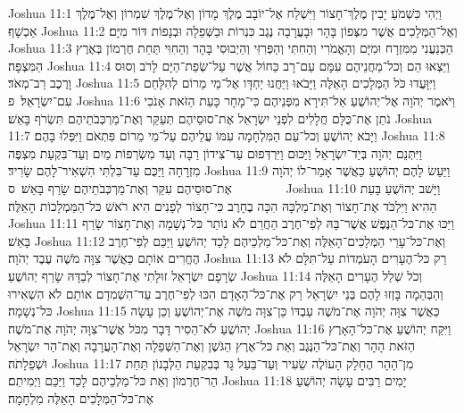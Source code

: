 Joshua 11:1	וַיְהִי כִּשְׁמֹעַ יָבִין מֶלֶךְ־חָצוֹר וַיִּשְׁלַח אֶל־יוֹבָב מֶלֶךְ מָדוֹן וְאֶל־מֶלֶךְ שִׁמְרוֹן וְאֶל־מֶלֶךְ אַכְשָׁף׃
Joshua 11:2	וְאֶל־הַמְּלָכִים אֲשֶׁר מִצְּפוֹן בָּהָר וּבָעֲרָבָה נֶגֶב כִּנְרוֹת וּבַשְּׁפֵלָה וּבְנָפוֹת דּוֹר מִיָּם׃
Joshua 11:3	הַכְּנַעֲנִי מִמִּזְרָח וּמִיָּם וְהָאֱמֹרִי וְהַחִתִּי וְהַפְּרִזִּי וְהַיְבוּסִי בָּהָר וְהַחִוִּי תַּחַת חֶרְמוֹן בְּאֶרֶץ הַמִּצְפָּה׃
Joshua 11:4	וַיֵּצְאוּ הֵם וְכל־מַחֲנֵיהֶם עִמָּם עַם־רָב כַּחוֹל אֲשֶׁר עַל־שְׂפַת־הַיָּם לָרֹב וְסוּס וָרֶכֶב רַב־מְאֹד׃
Joshua 11:5	וַיִּוָּעֲדוּ כֹּל הַמְּלָכִים הָאֵלֶּה וַיָּבֹאוּ וַיַּחֲנוּ יַחְדָּו אֶל־מֵי מֵרוֹם לְהִלָּחֵם עִם־יִשְׂרָאֵל׃ {פ}
Joshua 11:6	וַיֹּאמֶר יְהֹוָה אֶל־יְהוֹשֻׁעַ אַל־תִּירָא מִפְּנֵיהֶם כִּי־מָחָר כָּעֵת הַזֹּאת אָנֹכִי נֹתֵן אֶת־כֻּלָּם חֲלָלִים לִפְנֵי יִשְׂרָאֵל אֶת־סוּסֵיהֶם תְּעַקֵּר וְאֶת־מַרְכְּבֹתֵיהֶם תִּשְׂרֹף בָּאֵשׁ׃
Joshua 11:7	וַיָּבֹא יְהוֹשֻׁעַ וְכל־עַם הַמִּלְחָמָה עִמּוֹ עֲלֵיהֶם עַל־מֵי מֵרוֹם פִּתְאֹם וַיִּפְּלוּ בָּהֶם׃
Joshua 11:8	וַיִּתְּנֵם יְהֹוָה בְּיַד־יִשְׂרָאֵל וַיַּכּוּם וַיִּרְדְּפוּם עַד־צִידוֹן רַבָּה וְעַד מִשְׂרְפוֹת מַיִם וְעַד־בִּקְעַת מִצְפֶּה מִזְרָחָה וַיַּכֻּם עַד־בִּלְתִּי הִשְׁאִיר־לָהֶם שָׂרִיד׃
Joshua 11:9	וַיַּעַשׂ לָהֶם יְהוֹשֻׁעַ כַּאֲשֶׁר אָמַר־לוֹ יְהֹוָה אֶת־סוּסֵיהֶם עִקֵּר וְאֶת־מַרְכְּבֹתֵיהֶם שָׂרַף בָּאֵשׁ׃ {ס}        
Joshua 11:10	וַיָּשׁב יְהוֹשֻׁעַ בָּעֵת הַהִיא וַיִּלְכֹּד אֶת־חָצוֹר וְאֶת־מַלְכָּהּ הִכָּה בֶחָרֶב כִּי־חָצוֹר לְפָנִים הִיא רֹאשׁ כּל־הַמַּמְלָכוֹת הָאֵלֶּה׃
Joshua 11:11	וַיַּכּוּ אֶת־כּל־הַנֶּפֶשׁ אֲשֶׁר־בָּהּ לְפִי־חֶרֶב הַחֲרֵם לֹא נוֹתַר כּל־נְשָׁמָה וְאֶת־חָצוֹר שָׂרַף בָּאֵשׁ׃
Joshua 11:12	וְאֶת־כּל־עָרֵי הַמְּלָכִים־הָאֵלֶּה וְאֶת־כּל־מַלְכֵיהֶם לָכַד יְהוֹשֻׁעַ וַיַּכֵּם לְפִי־חֶרֶב הֶחֱרִים אוֹתָם כַּאֲשֶׁר צִוָּה מֹשֶׁה עֶבֶד יְהֹוָה׃
Joshua 11:13	רַק כּל־הֶעָרִים הָעֹמְדוֹת עַל־תִּלָּם לֹא שְׂרָפָם יִשְׂרָאֵל זוּלָתִי אֶת־חָצוֹר לְבַדָּהּ שָׂרַף יְהוֹשֻׁעַ׃
Joshua 11:14	וְכֹל שְׁלַל הֶעָרִים הָאֵלֶּה וְהַבְּהֵמָה בָּזְזוּ לָהֶם בְּנֵי יִשְׂרָאֵל רַק אֶת־כּל־הָאָדָם הִכּוּ לְפִי־חֶרֶב עַד־הִשְׁמִדָם אוֹתָם לֹא הִשְׁאִירוּ כּל־נְשָׁמָה׃
Joshua 11:15	כַּאֲשֶׁר צִוָּה יְהֹוָה אֶת־מֹשֶׁה עַבְדּוֹ כֵּן־צִוָּה מֹשֶׁה אֶת־יְהוֹשֻׁעַ וְכֵן עָשָׂה יְהוֹשֻׁעַ לֹא־הֵסִיר דָּבָר מִכֹּל אֲשֶׁר־צִוָּה יְהֹוָה אֶת־מֹשֶׁה׃
Joshua 11:16	וַיִּקַּח יְהוֹשֻׁעַ אֶת־כּל־הָאָרֶץ הַזֹּאת הָהָר וְאֶת־כּל־הַנֶּגֶב וְאֵת כּל־אֶרֶץ הַגֹּשֶׁן וְאֶת־הַשְּׁפֵלָה וְאֶת־הָעֲרָבָה וְאֶת־הַר יִשְׂרָאֵל וּשְׁפֵלָתֹה׃
Joshua 11:17	מִן־הָהָר הֶחָלָק הָעוֹלֶה שֵׂעִיר וְעַד־בַּעַל גָּד בְּבִקְעַת הַלְּבָנוֹן תַּחַת הַר־חֶרְמוֹן וְאֵת כּל־מַלְכֵיהֶם לָכַד וַיַּכֵּם וַיְמִיתֵם׃
Joshua 11:18	יָמִים רַבִּים עָשָׂה יְהוֹשֻׁעַ אֶת־כּל־הַמְּלָכִים הָאֵלֶּה מִלְחָמָה׃
